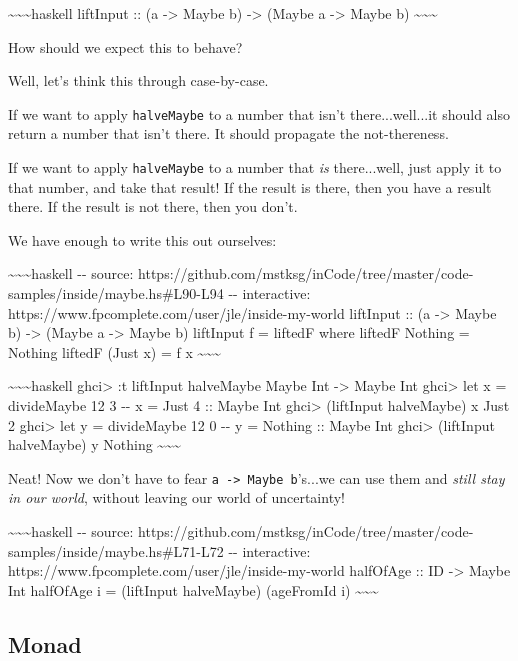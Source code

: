 \documentclass[]{article}
\begin{document}
\textasciitilde{}\textasciitilde{}\textasciitilde{}haskell liftInput :: (a
-\textgreater{} Maybe b) -\textgreater{} (Maybe a -\textgreater{} Maybe b)
\textasciitilde{}\textasciitilde{}\textasciitilde{}

How should we expect this to behave?

Well, let's think this through case-by-case.

If we want to apply \texttt{halveMaybe} to a number that isn't there...well...it
should also return a number that isn't there. It should propagate the
not-thereness.

If we want to apply \texttt{halveMaybe} to a number that \emph{is} there...well,
just apply it to that number, and take that result! If the result is there, then
you have a result there. If the result is not there, then you don't.

We have enough to write this out ourselves:

\textasciitilde{}\textasciitilde{}\textasciitilde{}haskell -\/- source:
https://github.com/mstksg/inCode/tree/master/code-samples/inside/maybe.hs\#L90-L94
-\/- interactive: https://www.fpcomplete.com/user/jle/inside-my-world liftInput
:: (a -\textgreater{} Maybe b) -\textgreater{} (Maybe a -\textgreater{} Maybe b)
liftInput f = liftedF where liftedF Nothing = Nothing liftedF (Just x) = f x
\textasciitilde{}\textasciitilde{}\textasciitilde{}

\textasciitilde{}\textasciitilde{}\textasciitilde{}haskell ghci\textgreater{} :t
liftInput halveMaybe Maybe Int -\textgreater{} Maybe Int ghci\textgreater{} let
x = divideMaybe 12 3 -\/- x = Just 4 :: Maybe Int ghci\textgreater{} (liftInput
halveMaybe) x Just 2 ghci\textgreater{} let y = divideMaybe 12 0 -\/- y =
Nothing :: Maybe Int ghci\textgreater{} (liftInput halveMaybe) y Nothing
\textasciitilde{}\textasciitilde{}\textasciitilde{}

Neat! Now we don't have to fear \texttt{a\ -\textgreater{}\ Maybe\ b}'s...we can
use them and \emph{still stay in our world}, without leaving our world of
uncertainty!

\textasciitilde{}\textasciitilde{}\textasciitilde{}haskell -\/- source:
https://github.com/mstksg/inCode/tree/master/code-samples/inside/maybe.hs\#L71-L72
-\/- interactive: https://www.fpcomplete.com/user/jle/inside-my-world halfOfAge
:: ID -\textgreater{} Maybe Int halfOfAge i = (liftInput halveMaybe) (ageFromId
i) \textasciitilde{}\textasciitilde{}\textasciitilde{}

\subsection{Monad}
\end{document}

